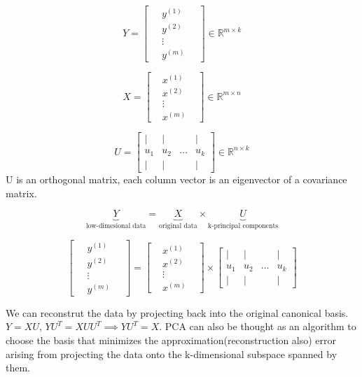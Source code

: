 \documentclass[12pt]{article}
\begin{document}
  $$ Y =\begin{bmatrix} 
 \	& y^{(1)} & \ \\
 \	& y^{(2)} & \ \\
 \	& \vdots &  \ \\
 \	& y^{(m)} &\
 \end{bmatrix}  \in \mathbb{R}^{m \times k}$$
 
 
 
 $$ X =\begin{bmatrix} 
 & x^{(1)} &  \\
 & x^{(2)} &\\
 & \vdots & \\
 & x^{(m)} &
 \end{bmatrix}  \in \mathbb{R}^{m \times n}$$
 
$$ U =\begin{bmatrix} 
\vert & \vert&  &\vert \\
u_{1} & u_{2} & \hdots & u_{k}\\
 
 \vert & \vert&  &\vert
 \end{bmatrix}  \in \mathbb{R}^{n \times k}$$ U is an orthogonal matrix, each column vector is an eigenvector of a  covariance matrix.
 
 $$\underbrace{Y}_\text{low-dimesional  data}= \underbrace{X} _\text{original data}  \times \underbrace{U}_\text{k-principal components}$$
 
$$ \begin{bmatrix} 
\	& y^{(1)} & \ \\
\	& y^{(2)} & \ \\
\	& \vdots &  \ \\
\	& y^{(m)} &\
\end{bmatrix}   =
 \begin{bmatrix} 
	& x^{(1)} &  \\
	& x^{(2)} &\\
	& \vdots & \\
	& x^{(m)} &
\end{bmatrix}  \times 
 \begin{bmatrix} 
	\vert & \vert&  &\vert \\
	u_{1} & u_{2} & \hdots & u_{k}\\
	
	\vert & \vert&  &\vert
\end{bmatrix}  $$


We can reconstrut the data by projecting back into the original canonical basis. $Y = XU$, $YU^{T} = XUU^{T} \implies YU^{T} = X$.
PCA can also be thought as an algorithm to choose the basis that minimizes the approximation(reconstruction also) error arising from projecting the
data onto the k-dimensional subspace spanned by them.
\end{document}
